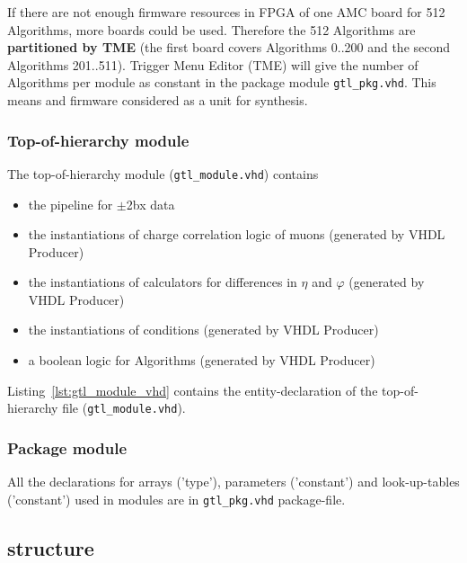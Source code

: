 If there are not enough firmware resources in FPGA of one AMC board for 512 Algorithms, more boards could be used. Therefore the 512 Algorithms are \textbf{partitioned by TME} (\eg the first board covers
Algorithms 0..200 and the second Algorithms 201..511). Trigger Menu Editor (TME) will give the number of Algorithms per module as constant in the package module \texttt{gtl\_pkg.vhd}.
This means \ugtl and \ufdl firmware considered as a unit for synthesis.\\

\subsubsection{Top-of-hierarchy module}
\label{sec:gtl:top_module}

The top-of-hierarchy module (\texttt{gtl\_module.vhd}) contains 
\begin {itemize}
\item the pipeline for $\pm$2bx data
\item the instantiations of charge correlation logic of muons (generated by VHDL Producer)
\item the instantiations of calculators for differences in $\eta$ and $\varphi$ (generated by VHDL Producer)
\item the instantiations of conditions (generated by VHDL Producer)
\item a boolean logic for Algorithms (generated by VHDL Producer)
\end {itemize}

Listing~\ref{lst:gtl_module_vhd} contains the entity-declaration of the top-of-hierarchy file (\texttt{gtl\_module.vhd}).



\subsubsection{Package module}
\label{sec:gtl:package_module}

All the declarations for arrays ('type'), parameters ('constant') and look-up-tables ('constant') used in modules are in \texttt{gtl\_pkg.vhd} package-file.

\clearpage

\subsection{\ugtl structure}
\label{sec:gtl:mgtl_structure}

